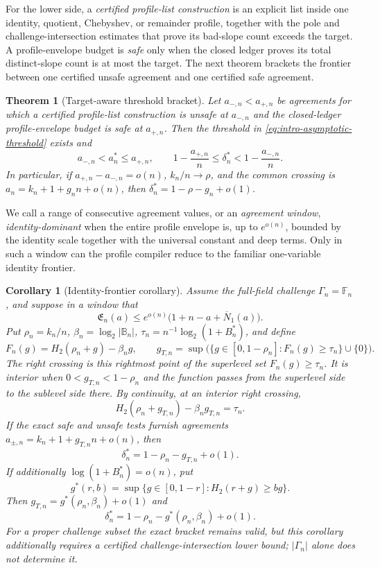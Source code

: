 \documentclass[12pt,a4paper]{amsart}
\numberwithin{equation}{section}
\newtheorem{theorem}{Theorem}[section]
\newtheorem{corollary}[corollary]{Corollary}
\theoremstyle{remark}
\newcommand{\F}{\mathbb F}
\newcommand{\B}{\mathbb B}
\newcommand{\barN}{\overline N}
\begin{document}
For the lower side, a \emph{certified profile-list construction} is an
explicit list inside one identity, quotient, Chebyshev, or remainder
profile, together with the pole and challenge-intersection estimates that
prove its bad-slope count exceeds the target.  A profile-envelope budget is
\emph{safe} only when the closed ledger proves its total distinct-slope
count is at most the target.  The next theorem brackets the frontier
between one certified unsafe agreement and one certified safe agreement.

\begin{theorem}[Target-aware threshold bracket]
\label{thm:intro-asymptotic-rs-mca}
Let \(a_{-,n}<a_{+,n}\) be agreements for which a certified profile-list
construction is unsafe at \(a_{-,n}\) and the closed-ledger
profile-envelope budget is safe at \(a_{+,n}\).  Then the threshold
in \eqref{eq:intro-asymptotic-threshold} exists and
\[
 a_{-,n}<a_n^*\le a_{+,n},\qquad
 1-\frac{a_{+,n}}n\le\delta_n^*<1-\frac{a_{-,n}}n.
 \tag{1.8}\label{eq:intro-threshold-bracket}
\]
In particular, if \(a_{+,n}-a_{-,n}=o(n)\), \(k_n/n\to\rho\), and the
common crossing is \(a_n=k_n+1+g_nn+o(n)\), then
\(\delta_n^*=1-\rho-g_n+o(1)\).
\end{theorem}

We call a range of consecutive agreement values, or an \emph{agreement
window}, \emph{identity-dominant} when the entire profile envelope
is, up to \(e^{o(n)}\), bounded by the identity scale together with the
universal constant and deep terms.  Only in such a window can the profile
compiler reduce to the familiar one-variable identity frontier.

\begin{corollary}[Identity-frontier corollary]
\label{cor:intro-identity-frontier}
Assume the full-field challenge \(\Gamma_n=\F_n\), and suppose in a
window that
\[
 \mathfrak E_n(a)\le e^{o(n)}
 \bigl(1+n-a+\barN_1(a)\bigr).
\]
Put \(\rho_n=k_n/n\), \(\beta_n=\log_2|\B_n|\),
\(\tau_n=n^{-1}\log_2(1+B_n^*)\), and
define
\[
 F_n(g)=H_2(\rho_n+g)-\beta_ng,\qquad
 g_{T,n}=\sup\bigl(\{g\in[0,1-\rho_n]:F_n(g)\ge\tau_n\}\cup\{0\}\bigr).
 \tag{1.9}\label{eq:intro-target-crossing}
\]
The \emph{right crossing} is this rightmost point of the superlevel set
\(F_n(g)\ge\tau_n\).  It is \emph{interior} when
\(0<g_{T,n}<1-\rho_n\) and the function passes from the superlevel side
to the sublevel side there.  By continuity, at an interior right crossing,
\[
 H_2(\rho_n+g_{T,n})-\beta_ng_{T,n}=\tau_n.
\]
If the exact safe and unsafe tests furnish agreements
\(a_{\pm,n}=k_n+1+g_{T,n}n+o(n)\), then
\[
 \delta_n^*=1-\rho_n-g_{T,n}+o(1).
\]
If additionally \(\log(1+B_n^*)=o(n)\), put
\[
 g^*(r,b)=\sup\{g\in[0,1-r]:H_2(r+g)\ge bg\}.
\]
Then \(g_{T,n}=g^*(\rho_n,\beta_n)+o(1)\) and
\[
 \delta_n^*
 =1-\rho_n-g^*(\rho_n,\beta_n)+o(1).              \tag{1.10}
\]
For a proper challenge subset the exact bracket remains valid, but this
corollary additionally requires a certified challenge-intersection lower
bound; \(|\Gamma_n|\) alone does not determine it.
\end{corollary}
\end{document}

